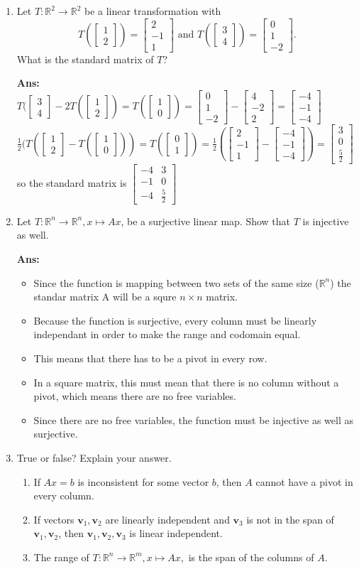 \documentclass[12pt,a4paper]{amsart}
\newcommand{\bv}{\mathbf v}
\newcommand{\R}{\mathbb{R}}
\newcommand\sol[1]{
\medskip
\begin{mdframed}
\textbf{Ans:\\} #1
\end{mdframed}
\medskip
}
\newcommand{\vt}[2]{\left[\begin{matrix} #1 \\ #2 \end{matrix}\right]}
\newcommand{\vd}[3]{\left[\begin{matrix} #1 \\ #2 \\ #3 \end{matrix}\right]}
\begin{document}
\begin{enumerate}
\item
 Let $T\colon \R^2\to\R^2$ be a linear transformation with
\[ T(\vt{1}{2}) = \vd{2}{-1}{1}\text{ and } T(\vt{3}{4}) = \vd{0}{1}{-2}. \]
 What is the standard matrix of $T$?

\sol{
  $T(\vt{3}{4}-2T(\vt{1}{2})=T(\vt{1}{0})=\vd{0}{1}{-2}-\vd{4}{-2}{2}=\vd{-4}{-1}{-4}$\\
  $\frac{1}{2}(T(\vt{1}{2}-T(\vt{1}{0}))=T(\vt{0}{1})=\frac{1}{2}(\vd{2}{-1}{1}-\vd{-4}{-1}{-4})=\vd{3}{0}{\frac{5}{2}}$\\
  so the standard matrix is $\left[\begin{matrix} -4 & 3 \\ -1 & 0 \\ -4 & \frac{5}{2} \end{matrix}\right]$

}
 
\item
 Let $T\colon \R^n\to\R^n, x\mapsto Ax$, be a surjective linear map. Show that $T$ is injective as well.  
 \sol{ \begin{itemize}
     \item Since the function is mapping between two sets of the same size ($\R^n$) the standar matrix A will be a squre $n\times n$ matrix.\\
     \item Because the function is surjective, every column must be linearly independant in order to make the range and codomain equal.\\
     \item This means that there has to be a pivot in every row.\\
     \item In a square matrix, this must mean that there is no column without a pivot, which means there are no free variables.\\
     \item Since there are no free variables, the function must be injective as well as surjective.
 \end{itemize} 
}

\item
 True or false? Explain your answer.
\begin{enumerate}
\item 
 If $Ax=b$ is inconsistent for some vector $b$, then $A$ cannot have a pivot in every column.
   
\item
  If vectors $\bv_1,\bv_2$ are linearly independent and $\bv_3$ is not in the span of $\bv_1,\bv_2$,
  then $\bv_1,\bv_2,\bv_3$ is linear independent.
\item
 The range of $T\colon\R^n\to\R^m, x\mapsto Ax,$ is the span of the columns of $A$.  
\end{enumerate}


\end{enumerate}
\end{document}
